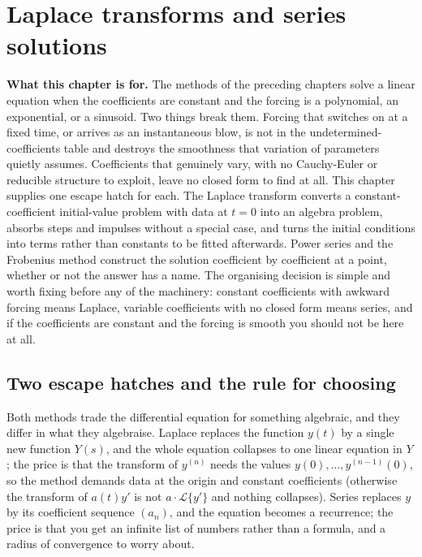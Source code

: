 \chapter{Laplace transforms and series solutions}

\begin{orient}
\textbf{What this chapter is for.} The methods of the preceding chapters solve a linear equation when the coefficients are constant and the forcing is a polynomial, an exponential, or a sinusoid. Two things break them. Forcing that switches on at a fixed time, or arrives as an instantaneous blow, is not in the undetermined-coefficients table and destroys the smoothness that variation of parameters quietly assumes. Coefficients that genuinely vary, with no Cauchy-Euler or reducible structure to exploit, leave no closed form to find at all. This chapter supplies one escape hatch for each. The Laplace transform converts a constant-coefficient initial-value problem with data at $t=0$ into an algebra problem, absorbs steps and impulses without a special case, and turns the initial conditions into terms rather than constants to be fitted afterwards. Power series and the Frobenius method construct the solution coefficient by coefficient at a point, whether or not the answer has a name. The organising decision is simple and worth fixing before any of the machinery: constant coefficients with awkward forcing means Laplace, variable coefficients with no closed form means series, and if the coefficients are constant and the forcing is smooth you should not be here at all.
\end{orient}

\section{Two escape hatches and the rule for choosing}

Both methods trade the differential equation for something algebraic, and they differ in what they algebraise. Laplace replaces the function $y(t)$ by a single new function $Y(s)$, and the whole equation collapses to one linear equation in $Y$; the price is that the transform of $y^{(n)}$ needs the values $y(0),\dots,y^{(n-1)}(0)$, so the method demands data at the origin and constant coefficients (otherwise the transform of $a(t)y'$ is not $a\cdot\mathcal{L}\{y'\}$ and nothing collapses). Series replaces $y$ by its coefficient sequence $(a_n)$, and the equation becomes a recurrence; the price is that you get an infinite list of numbers rather than a formula, and a radius of convergence to worry about.


